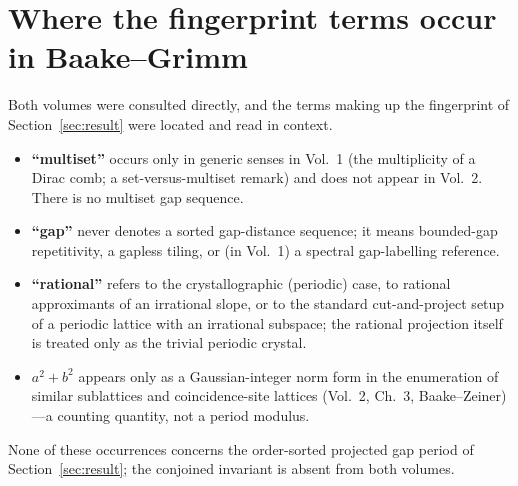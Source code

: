 \documentclass[11pt]{article}
\theoremstyle{plain}
\theoremstyle{remark}
\begin{document}
\section{Where the fingerprint terms occur in Baake--Grimm}\label{app:bgrimm}

Both volumes \cite{BaakeGrimm2013,BaakeGrimm2017} were consulted directly, and the
terms making up the fingerprint of Section~\ref{sec:result} were located and read in
context.
\begin{itemize}[leftmargin=1.8em,itemsep=2pt]
  \item \textbf{``multiset''} occurs only in generic senses in Vol.~1 (the
        multiplicity of a Dirac comb; a set-versus-multiset remark) and does not
        appear in Vol.~2.  There is no multiset gap sequence.
  \item \textbf{``gap''} never denotes a sorted gap-distance sequence; it means
        bounded-gap repetitivity, a gapless tiling, or (in Vol.~1) a spectral
        gap-labelling reference.
  \item \textbf{``rational''} refers to the crystallographic (periodic) case, to
        rational approximants of an irrational slope, or to the standard
        cut-and-project setup of a periodic lattice with an irrational subspace; the
        rational projection itself is treated only as the trivial periodic crystal.
  \item \textbf{\(a^2+b^2\)} appears only as a Gaussian-integer norm form in the
        enumeration of similar sublattices and coincidence-site lattices (Vol.~2,
        Ch.~3, Baake--Zeiner)---a counting quantity, not a period modulus.
\end{itemize}
None of these occurrences concerns the order-sorted projected gap period of
Section~\ref{sec:result}; the conjoined invariant is absent from both volumes.
\end{document}
